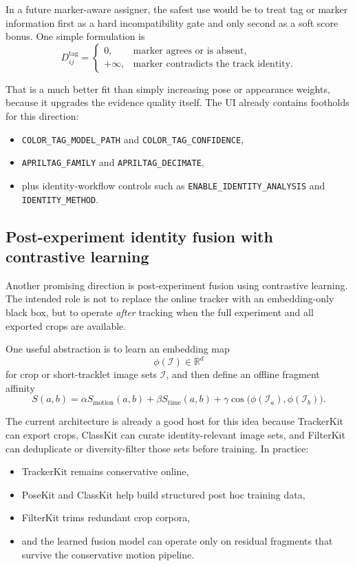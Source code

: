 \documentclass[11pt]{article}
\newcommand{\runtimekey}[1]{\texttt{#1}}
\begin{document}
In a future marker-aware assigner, the safest use would be to treat tag or marker information first as a hard incompatibility gate and only second as a soft score bonus. One simple formulation is
\begin{equation}
  D^{\text{tag}}_{ij} =
  \begin{cases}
    0, & \text{marker agrees or is absent},\\
    +\infty, & \text{marker contradicts the track identity}.
  \end{cases}
\end{equation}

That is a much better fit than simply increasing pose or appearance weights, because it upgrades the evidence quality itself. The UI already contains footholds for this direction:
\begin{itemize}
  \item \runtimekey{COLOR\_TAG\_MODEL\_PATH} and \runtimekey{COLOR\_TAG\_CONFIDENCE},
  \item \runtimekey{APRILTAG\_FAMILY} and \runtimekey{APRILTAG\_DECIMATE},
  \item plus identity-workflow controls such as \runtimekey{ENABLE\_IDENTITY\_ANALYSIS} and \runtimekey{IDENTITY\_METHOD}.
\end{itemize}

\subsection{Post-experiment identity fusion with contrastive learning}

Another promising direction is post-experiment fusion using contrastive learning. The intended role is not to replace the online tracker with an embedding-only black box, but to operate \emph{after} tracking when the full experiment and all exported crops are available.

One useful abstraction is to learn an embedding map
\begin{equation}
  \phi(\mathcal{I}) \in \mathbb{R}^d
\end{equation}
for crop or short-tracklet image sets $\mathcal{I}$, and then define an offline fragment affinity
\begin{equation}
  S(a,b) =
  \alpha S_{\text{motion}}(a,b)
  + \beta S_{\text{time}}(a,b)
  + \gamma \cos\!\bigl(\phi(\mathcal{I}_a), \phi(\mathcal{I}_b)\bigr).
\end{equation}

The current architecture is already a good host for this idea because TrackerKit can export crops, ClassKit can curate identity-relevant image sets, and FilterKit can deduplicate or diversity-filter those sets before training. In practice:
\begin{itemize}
  \item TrackerKit remains conservative online,
  \item PoseKit and ClassKit help build structured post hoc training data,
  \item FilterKit trims redundant crop corpora,
  \item and the learned fusion model can operate only on residual fragments that survive the conservative motion pipeline.
\end{itemize}
\end{document}
